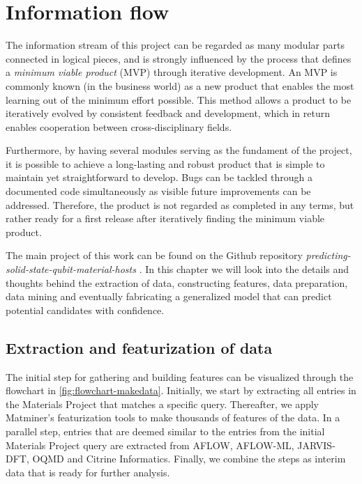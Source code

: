 \chapter{Information flow}

The information stream of this project can be regarded as many modular parts connected in logical pieces, and is strongly influenced by the process that defines a \textit{minimum viable product} (MVP) through iterative development. An MVP is commonly known (in the business world) as a new product that enables the most learning out of the minimum effort possible. This method allows a product to be iteratively evolved by consistent feedback and development, which in return enables cooperation between cross-disciplinary fields.

Furthermore, by having several modules serving as the fundament of the project, it is possible to achieve a long-lasting and robust product that is simple to maintain yet straightforward to develop. Bugs can be tackled through a documented code simultaneously as visible future improvements can be addressed. Therefore, the product is not regarded as completed in any terms, but rather ready for a first release after iteratively finding the minimum viable product.

The main project of this work can be found on the Github repository \textit{predicting-solid-state-qubit-material-hosts} \cite{Ohebbi2021}. In this chapter we will look into the details and thoughts behind the extraction of data, constructing features, data preparation, data mining and eventually fabricating a generalized model that can predict potential candidates with confidence.

\section{Extraction and featurization of data}

The initial step for gathering and building features can be visualized through the flowchart in \autoref{fig:flowchart-makedata}. Initially, we start by extracting all entries in the Materials Project that matches a specific query. Thereafter, we apply Matminer's featurization tools to make thousands of features of the data. In a parallel step, entries that are deemed similar to the entries from the initial Materials Project query are extracted from AFLOW, AFLOW-ML, JARVIS-DFT, OQMD and Citrine Informatics. Finally, we combine the steps as interim data that is ready for further analysis.

